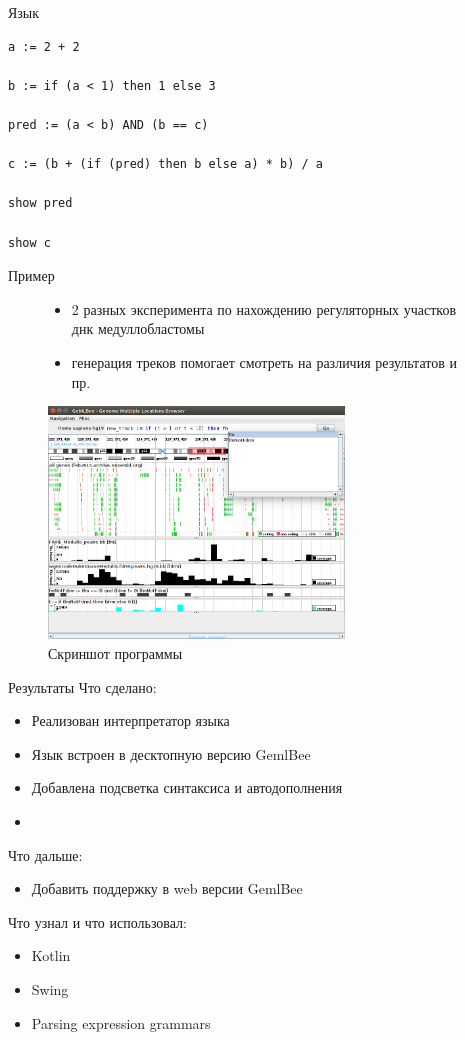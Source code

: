 \begin{frame}[fragile]{Язык}
\begin{lstlisting}
a := 2 + 2 

b := if (a < 1) then 1 else 3

pred := (a < b) AND (b == c)

c := (b + (if (pred) then b else a) * b) / a

show pred

show c
\end{lstlisting}

\end{frame}

\begin{frame}{Пример}
\begin{figure}
\small{
	\begin{itemize}
		\item 2 разных эксперимента по нахождению регуляторных участков днк медуллобластомы
		\item генерация треков помогает смотреть на различия результатов и пр.
	\end{itemize}
}
\centering
\includegraphics[width=0.7\textwidth]{ex.png}
\caption{Скриншот программы}
\end{figure}
\end{frame}

\begin{frame}{Результаты}
\alert{Что сделано:}
\begin{itemize}
	\item Реализован интерпретатор языка
	\item Язык встроен в десктопную версию GemlBee
	\item Добавлена подсветка синтаксиса и автодополнения
	\item {}
\end{itemize}
\alert{Что дальше:}
\begin{itemize}
	\item Добавить поддержку в web версии GemlBee
\end{itemize}

\alert{Что узнал и что использовал:}
\begin{itemize}
	\item Kotlin
	\item Swing
	\item Parsing expression grammars
\end{itemize}
\end{frame}

